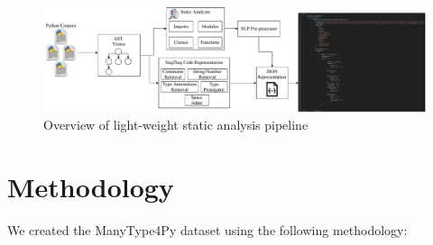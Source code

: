 \documentclass[10pt, conference]{IEEEtran}
\begin{document}
\begin{figure}[!t]
	\centering
	\includegraphics[width=\linewidth]{figs/manytypes4py-pipeline.pdf}
	\caption{Overview of light-weight static analysis pipeline}
	\label{fig:overview-pipeline-sa}
\end{figure}

\section{Methodology}
We created the ManyType4Py dataset using the following methodology:
\end{document}
